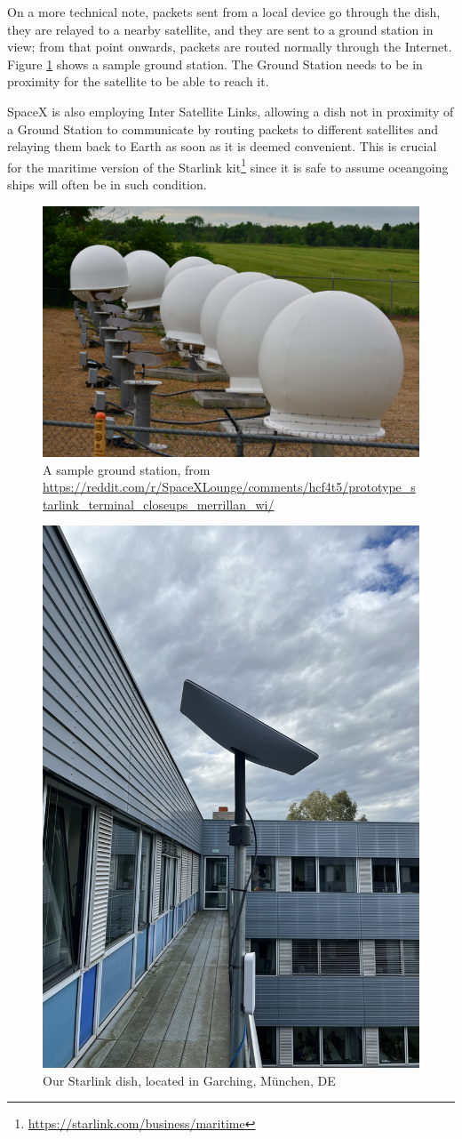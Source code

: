 \documentclass[IN,11pt,twoside,openright,idp,english]{tumthesis}
\begin{document}
On a more technical note, packets sent from a local device go through the dish, they are relayed to a nearby satellite,
and they are sent to a ground station in view; from that point onwards, packets are routed normally through the
Internet. Figure \ref{fig:gs} shows a sample ground station. The Ground Station needs to be in proximity for the
satellite to be able to reach it.   
    
SpaceX is also employing Inter Satellite Links, allowing a dish not in proximity of a Ground Station to communicate by
routing packets to different satellites and relaying them back to Earth as soon as it is deemed convenient. This is
crucial for the maritime version of the Starlink kit\footnote{\url{https://starlink.com/business/maritime}} since it is
safe to assume oceangoing ships will often be in such condition.
   
\begin{figure}
    \centering
    \includegraphics[width=0.6\columnwidth]{img/ground-station.jpeg}
    \caption{A sample ground station, from \small\protect\url{https://reddit.com/r/SpaceXLounge/comments/hcf4t5/prototype_starlink_terminal_closeups_merrillan_wi/}}
    \label{fig:gs}
\end{figure}
    
\begin{figure}
    \centering
    \includegraphics[width=0.6\columnwidth]{img/dish.jpeg}
    \caption{Our Starlink dish, located in Garching, München, DE}
    \label{fig:dish}
\end{figure}
    
\end{document}
